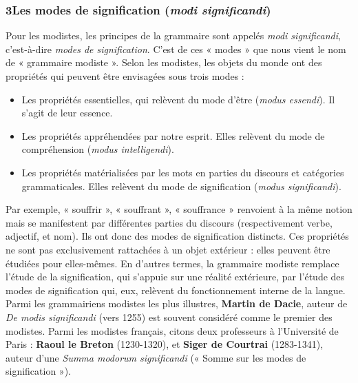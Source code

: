 \subsubsection*{3\quad Les modes de signification (\textit{modi significandi})}
Pour les modistes, les principes de la grammaire sont appelés \textit{modi significandi}, c’est-à-dire \textit{modes de signification}. C’est de ces « modes » que nous vient le nom de « grammaire modiste ». Selon les modistes, les objets du monde ont des propriétés qui peuvent être envisagées sous trois modes :
\begin{itemize}
\item Les propriétés essentielles, qui relèvent du mode d’être (\textit{modus essendi}). Il s’agit de leur essence.
\item Les propriétés appréhendées par notre esprit. Elles relèvent du mode de compréhension (\textit{modus intelligendi}).
\item Les propriétés matérialisées par les mots en parties du discours et catégories grammaticales. Elles relèvent du mode de signification (\textit{modus significandi}).
\end{itemize}
Par exemple, « souffrir », « souffrant », « souffrance » renvoient à la même notion mais se manifestent par différentes parties du discours (respectivement verbe, adjectif, et nom). Ils ont donc des modes de signification distincts. Ces propriétés ne sont pas exclusivement rattachées à un objet extérieur : elles peuvent être étudiées pour elles-mêmes. En d’autres termes, la grammaire modiste remplace l’étude de la signification, qui s’appuie sur une réalité extérieure, par l’étude des modes de signification qui, eux, relèvent du fonctionnement interne de la langue. Parmi les grammairiens modistes les plus illustres, \textbf{Martin de Dacie}, auteur de \textit{De modis significandi} (vers 1255) est souvent considéré comme le premier des modistes. Parmi les modistes français, citons deux professeurs à l’Université de Paris : \textbf{Raoul le Breton} (1230-1320), et \textbf{Siger de Courtrai} (1283-1341), auteur d’une \textit{Summa modorum significandi} (« Somme sur les modes de signification »).

